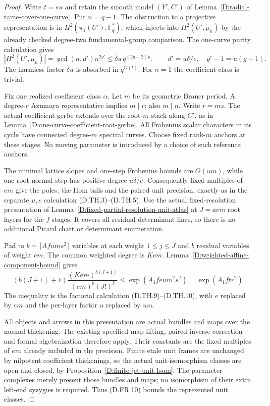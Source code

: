 \begin{proof}
Write $t=eu$ and retain the smooth model $(Y',C')$ of
Lemma~\ref{D:radial-tame-cover-one-curve}. Put $n=q-1$.
The obstruction to a projective representation is in
$H^2(\pi_1(U'),\mathbb F_q^*)$, which injects into
$H^2(U',\mu_n)$ by the already checked degree-two
fundamental-group comparison. The one-curve purity
calculation gives
\[
 |H^2(U',\mu_n)|=\gcd(n,d')n^{2g'}
       \leq \delta u\,q^{(2g+2)u},\qquad
 d'=u\delta/e,\quad g'-1=u(g-1).                       \tag{D.FR.9}
\]
The harmless factor $\delta u$ is absorbed in
$q^{O(t)}$. For $n=1$ the coefficient class is trivial.

Fix one realized coefficient class $\alpha$. Let $m$
be its geometric Brauer period. A degree-$r$ Azumaya
representative implies $m\mid r$; also $m\mid n$.
Write $r=ms$. The actual coefficient gerbe extends
over the root-$m$ stack along $C'$, as in
Lemma~\ref{D:one-curve-coefficient-root-gerbe}.
All Frobenius scalar characters in its cycle have
connected degree-$m$ spectral curves. Choose fixed
rank-$m$ anchors at these stages. No moving parameter
is introduced by a choice of such reference anchors.

The minimal lattice slopes and one-step Frobenius
bounds are $O(um)$, while one root-normal step has
positive degree $u\delta/e$. Consequently fixed
multiples of $em$ give the poles, the Hom tails and
the paired unit precision, exactly as in the separate
$u,e$ calculation (D.TH.3)--(D.TH.5). Use the actual
fixed-resolution presentation of
Lemma~\ref{D:fixed-partial-resolution-unit-atlas} at
$J=ae m$ root layers for the $f$ stages. It covers
all residual determinant lines, so there is no
additional Picard chart or determinant enumeration.

Pad to $b=\lceil Afum s^2\rceil$ variables at each
weight $1\leq j\leq J$ and $b$ residual variables
of weight $em$. The common weighted degree is $Ke m$.
Lemma~\ref{D:weighted-affine-component-bound} gives
\[
 (b(J+1)+1)\frac{(Ke m)^{b(J+1)}}{(em)^b(J!)^b}
          \leq\exp(A_1f e u m^2s^2)
          =\exp(A_1f t r^2).                           \tag{D.FR.10}
\]
The inequality is the factorial calculation
(D.TH.9)--(D.TH.10), with $e$ replaced by $em$ and
the per-layer factor $u$ replaced by $um$.

All objects and arrows in this presentation are
actual bundles and maps over the normal thickening.
The existing specified-map lifting, paired inverse
correction and formal algebraization therefore apply.
Their constants are the fixed multiples of $em$
already included in the precision. Finite etale
unit frames are unchanged by nilpotent coefficient
thickenings, so the actual unit-isomorphism classes
are open and closed, by
Proposition~\ref{D:finite-jet-unit-Isom}. The parameter
complexes merely present those bundles and maps;
no isomorphism of their extra left-end syzygies is
required. Thus (D.FR.10) bounds the represented
unit classes.


\end{proof}
